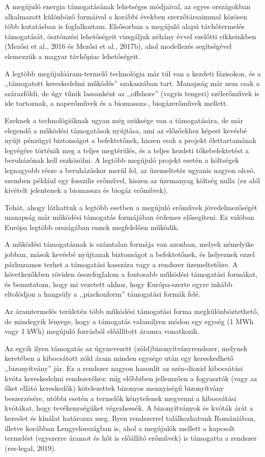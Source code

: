 \documentclass[twoside, magyar, showtrims]{corvinusphd}
\theoremstyle{plain}
\theoremstyle{remark}
\theoremstyle{definition}
\begin{document}
A megújuló energia támogatásának lehetséges módjaival,
az egyes országokban alkalmazott különböző formáival
a korábbi években szerzőtársaimmal közösen
több kutatásban is foglalkoztam. Elsősorban 
a megújuló alapú távhőtermelés támogatását,
ösztönzési lehetőségeit vizsgáljuk néhány évvel
ezelőtti cikkeinkben (Mezősi et al., 2016 és
Mezősi et al., 2017b), ahol modellezés segítségével
elemezzük a magyar távhőpiac lehetőségeit.

A legtöbb megújulóáram-termelő technológia
már túl van a kezdeti fázisokon,
és a ,,támogatott kereskedelmi működés'' szakaszában tart.
Manapság már nem csak a szárazföldi,
de úgy tűnik lassanként az ,,offshore''
(vagyis tengeri) szélerőművek is ide tartoznak,
a naperőművek és a biomassza-, biogázerőművek mellett.

Ezeknek a technológiáknak
ugyan még szüksége van a támogatására,
de már elegendő a működési
támogatások nyújtása, ami az előzőekhez
képest kevésbé nyújt pénzügyi biztonságot a befektetőnek,
hiszen csak a projekt élettartamának legvégére történik
meg a teljes megtérülés, és a teljes kezdeti tőkebefektetést
a beruházónak kell eszközölni. A legtöbb megújuló
projekt esetén a költségek legnagyobb része a beruházáskor merül fel,
az üzemeltetés ugyanis nagyon olcsó,
szemben például egy fosszilis erőművel, hiszen az üzemanyag költség nulla
(ez alól kivételt jelentenek a biomassza és biogáz erőművek).

Tehát, ahogy láthattuk a legtöbb esetben a
megújuló erőművek jövedelmezőségét
manapság már működési támogatás
formájában érdemes elősegíteni. Ez valóban Európa
legtöbb országában ennek megfelelően működik.

A működési támogatásnak is
számtalan formája van azonban, melyek némelyike jobban, mások kevésbé
nyújtanak biztonságot a befektetőnek, és helyeznek ezzel párhuzamos terhet
a támogatási kasszára vagy a rendszer üzemeltetőire.
A következőkben röviden összefoglalom a fontosabb működési támogatási formákat,
és bemutatom, hogy mi vezetett ahhoz,
hogy Európa-szerte egyre inkább eltolódjon a hangsúly
a ,,piackonform'' támogatási formák felé.

Az áramtermelés területén több
működési támogatási forma megkülönböztethető,
de mindegyik lényege, hogy a támogatás valamilyen
módon egy egység (1 MWh vagy 1 kWh)
megújuló forrásból előállított áramra vonatkozik.

Az egyik ilyen támogatás az úgynevezett
(zöld)bizonyítványrendszer, melynek keretében
a kibocsátott zöld áram minden egysége után
egy kereskedhető ,,bizonyítvány'' jár.
Ez a rendszer nagyon hasonlít az 
szén-dioxid kibocsátási kvóta kereskedelmi rendszeréhez:
míg előbbiben jellemzően a fogyasztók
(vagy az őket ellátó kereskedők)
kötelezettek bizonyos mennyiségű bizonyítvány
beszerzésére, utóbbi esetén a termelők
kénytelenek megvenni a kibocsátási kvótákat,
hogy tevékenységüket végezhessék.
A bizonyítványok és kvóták árát a kereslet és kínálat
határozza meg. Ilyen rendszerrel találkozhatunk
Romániában, illetve korábban
Lengyelországban is, ahol a megújulók mellett
a kapcsolt termelést (egyszerre áramot és hőt 
is előállító erőművek) is támogatta a rendszer (res-legal, 2019).
\end{document}
